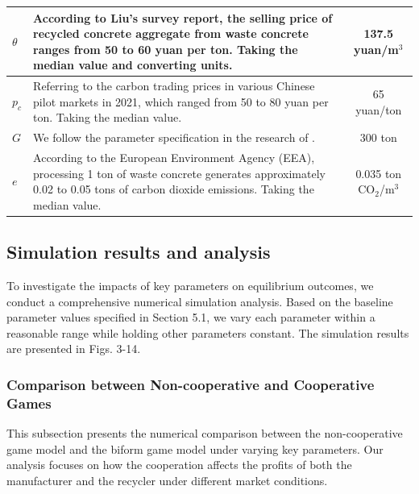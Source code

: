 \documentclass[authoryear,preprint,review,times,10pt]{elsarticle}
\begin{document}
\begin{table}[!htbp]
\begin{tabular}{lp{6cm}c}
\midrule
$\theta$ & According to Liu's survey report, the selling price of recycled concrete aggregate from waste concrete ranges from 50 to 60 yuan per ton. Taking the median value and converting units. & 137.5 yuan/m$^3$ \\
\midrule
$p_c$ & Referring to the carbon trading prices in various Chinese pilot markets in 2021, which ranged from 50 to 80 yuan per ton. Taking the median value. & 65 yuan/ton \\
\midrule
$G$ & We follow the parameter specification in the research of \cite{sun2021Optimal}. & 300 ton \\
\midrule
$e$ & According to the European Environment Agency (EEA), processing 1 ton of waste concrete generates approximately 0.02 to 0.05 tons of carbon dioxide emissions. Taking the median value. & 0.035 ton CO$_2$/m$^3$ \\
\bottomrule
\end{tabular}
\end{table}
\vspace{-15pt}

\subsection{Simulation results and analysis}
\label{sec:simulation_analysis}

To investigate the impacts of key parameters on equilibrium outcomes, we conduct a comprehensive numerical simulation analysis. Based on the baseline parameter values specified in Section 5.1, we vary each parameter within a reasonable range while holding other parameters constant. The simulation results are presented in Figs. 3-14.

\subsubsection{Comparison between Non-cooperative and Cooperative Games}
\label{sec:comparison}

This subsection presents the numerical comparison between the non-cooperative game model and the biform game model under varying key parameters. Our analysis focuses on how the cooperation affects the profits of both the manufacturer and the recycler under different market conditions.
\end{document}
